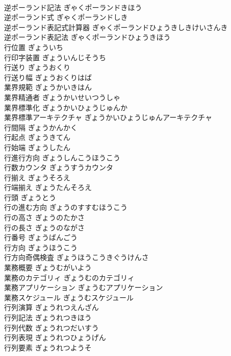 \documentclass[8pt]{extreport}
\begin{document}
\begin{CJK}{UTF8}{min}
\\	逆ポーランド記法	ぎゃくポーランドきほう	
\\	逆ポーランド式	ぎゃくポーランドしき	
\\	逆ポーランド表記式計算器	ぎゃくポーランドひょうきしきけいさんき	
\\	逆ポーランド表記法	ぎゃくポーランドひょうきほう	
\\	行位置	ぎょういち	
\\	行印字装置	ぎょういんじそうち	
\\	行送り	ぎょうおくり	
\\	行送り幅	ぎょうおくりはば	
\\	業界規範	ぎょうかいきはん	
\\	業界精通者	ぎょうかいせいつうしゃ	
\\	業界標準化	ぎょうかいひょうじゅんか	
\\	業界標準アーキテクチャ	ぎょうかいひょうじゅんアーキテクチャ	
\\	行間隔	ぎょうかんかく	
\\	行起点	ぎょうきてん	
\\	行始端	ぎょうしたん	
\\	行進行方向	ぎょうしんこうほうこう	
\\	行数カウンタ	ぎょうすうカウンタ	
\\	行揃え	ぎょうそろえ	
\\	行端揃え	ぎょうたんそろえ	
\\	行頭	ぎょうとう	
\\	行の進む方向	ぎょうのすすむほうこう	
\\	行の高さ	ぎょうのたかさ	
\\	行の長さ	ぎょうのながさ	
\\	行番号	ぎょうばんごう	
\\	行方向	ぎょうほうこう	
\\	行方向奇偶検査	ぎょうほうこうきぐうけんさ	
\\	業務概要	ぎょうむがいよう	
\\	業務のカテゴリィ	ぎょうむのカテゴリィ	
\\	業務アプリケーション	ぎょうむアプリケーション	
\\	業務スケジュール	ぎょうむスケジュール	
\\	行列演算	ぎょうれつえんざん	
\\	行列記法	ぎょうれつきほう	
\\	行列代数	ぎょうれつだいすう	
\\	行列表現	ぎょうれつひょうげん	
\\	行列要素	ぎょうれつようそ	

\end{CJK}
\end{document}
